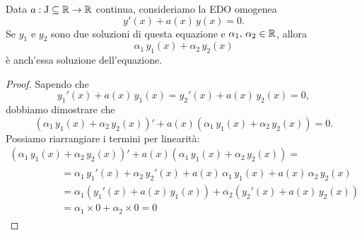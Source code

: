 \documentclass[../../analisi2]{subfiles}
\begin{document}
        \begin{teorema}
            Data \(a : \mathrm{J} \subseteq \mathbb{R} \to \mathbb{R}\) continua, consideriamo la EDO omogenea
            \[
                y'(x) + a(x) \, y(x) = 0.
            \]
            Se \(y_1\) e \(y_2\) sono due soluzioni di questa equazione e \(\alpha_1, \, \alpha_2 \in \mathbb{R}\), allora
            \[
                \alpha_1 \, y_1(x) + \alpha_2 \, y_2(x)
            \]
            è anch'essa soluzione dell'equazione.
        \end{teorema}
        \begin{proof}
            Sapendo che
            \[
                y_1'(x) + a(x) \, y_1(x) = y_2'(x) + a(x) \, y_2(x) = 0,
            \]
            dobbiamo dimostrare che
            \[
                \left(\alpha_1 \, y_1(x) + \alpha_2 \, y_2(x)\right)' + a(x) \left(\alpha_1 \, y_1(x) + \alpha_2 \, y_2(x)\right) = 0.
            \]
            Possiamo riarrangiare i termini per linearità:
            \begin{gather*}
                \left(\alpha_1 \, y_1(x) + \alpha_2 \, y_2(x)\right)' + a(x) \left(\alpha_1 \, y_1(x) + \alpha_2 \, y_2(x)\right) =\\
                \qquad\qquad
                \begin{aligned}
                    &= \alpha_1 \, y_1'(x) + \alpha_2 \, y_2'(x) + a(x) \, \alpha_1 \, y_1(x) + a(x) \, \alpha_2 \, y_2(x)\\
                    &= \alpha_1 \left(y_1'(x) + a(x) \, y_1(x)\right) + \alpha_2 \left(y_2'(x) + a(x) \, y_2(x)\right)\\
                    &= \alpha_1 \times 0 + \alpha_2 \times 0 = 0
                \end{aligned}
            \end{gather*}
        \end{proof}
\end{document}
